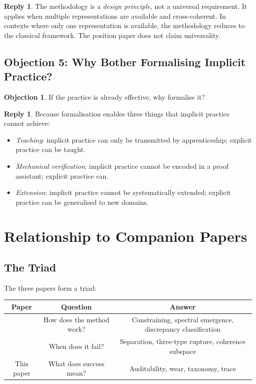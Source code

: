 \documentclass[11pt,a4paper]{article}
\theoremstyle{definition}
\newtheorem{objection}[definition]{Objection}
\newtheorem{reply}[definition]{Reply}
\theoremstyle{plain}
\begin{document}
\begin{reply}
The methodology is a \emph{design principle}, not a universal
requirement. It applies when multiple representations are available
and cross-coherent. In contexts where only one representation is
available, the methodology reduces to the classical framework. The
position paper does not claim universality.
\end{reply}

\subsection{Objection 5: Why Bother Formalising Implicit Practice?}

\begin{objection}
If the practice is already effective, why formalise it?
\end{objection}

\begin{reply}
Because formalisation enables three things that implicit practice
cannot achieve:
\begin{itemize}
  \item \emph{Teaching}: implicit practice can only be transmitted
        by apprenticeship; explicit practice can be taught.
  \item \emph{Mechanical verification}: implicit practice cannot be
        encoded in a proof assistant; explicit practice can.
  \item \emph{Extension}: implicit practice cannot be systematically
        extended; explicit practice can be generalised to new
        domains.
\end{itemize}
\end{reply}

\section{Relationship to Companion Papers}
\label{sec:relationship}

\subsection{The Triad}

The three papers form a triad:

\begin{center}
\begin{tabular}{c|c|c}
  \toprule
  Paper & Question & Answer \\
  \midrule
  \cite{paperI} & How does the method work?
    & Constraining, spectral emergence, discrepancy classification \\
  \cite{paperII} & When does it fail?
    & Separation, three-type rupture, coherence subspace \\
  This paper & What does success mean?
    & Auditability, wear, taxonomy, trace \\
  \bottomrule
\end{tabular}
\end{center}
\end{document}

